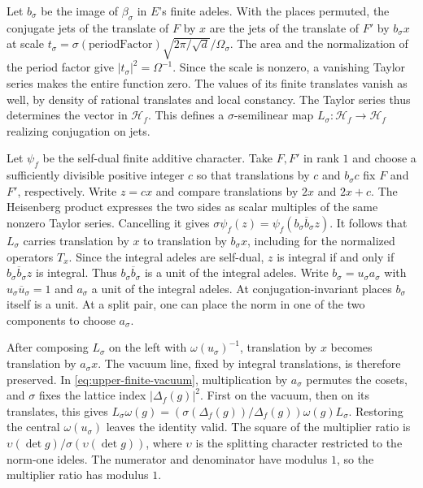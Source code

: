 Let \(b_\sigma\) be the image of \(\beta_\sigma\) in \(E\)'s finite
adeles. With the places permuted, the conjugate jets of the translate
of \(F\) by \(x\) are the jets of the translate of \(F'\) by
\(b_\sigma x\) at scale
\(t_\sigma=\sigma(\mathrm{periodFactor})\sqrt{2\pi/\sqrt d}/\Omega_\sigma\).
The area and the normalization of the period factor give
\(|t_\sigma|^2=\Omega^{-1}\). Since the scale is nonzero, a vanishing
Taylor series makes the entire function zero. The values of its
finite translates vanish as well, by density of rational translates
and local constancy. The Taylor series thus determines the vector
in \(\mathscr H_f\). This defines a \(\sigma\)-semilinear map
\(L_\sigma:\mathscr H_f\to\mathscr H_f\) realizing conjugation on jets.

Let \(\psi_f\) be the self-dual finite additive character. Take \(F,F'\)
in rank \(1\) and choose a sufficiently divisible positive integer
\(c\) so that translations by \(c\) and \(b_\sigma c\) fix \(F\) and
\(F'\), respectively. Write \(z=cx\) and compare translations by \(2x\)
and \(2x+c\). The Heisenberg product expresses the two sides as scalar
multiples of the same nonzero Taylor series. Cancelling it gives
\(\sigma\psi_f(z)=\psi_f(b_\sigma\overline b_\sigma z)\).
It follows that \(L_\sigma\) carries translation by \(x\) to translation
by \(b_\sigma x\), including for the normalized operators \(T_x\).
Since the integral adeles are self-dual, \(z\) is integral if and only
if \(b_\sigma\overline b_\sigma z\) is integral.
Thus \(b_\sigma\overline b_\sigma\) is a unit of the integral adeles.
Write \(b_\sigma=u_\sigma a_\sigma\) with \(u_\sigma\overline u_\sigma=1\)
and \(a_\sigma\) a unit of the integral adeles. At conjugation-invariant
places \(b_\sigma\) itself is a unit. At a split pair, one can place
the norm in one of the two components to choose \(a_\sigma\).

After composing \(L_\sigma\) on the left with \(\omega(u_\sigma)^{-1}\),
translation by \(x\) becomes translation by \(a_\sigma x\).
The vacuum line, fixed by integral translations, is therefore preserved.
In \eqref{eq:upper-finite-vacuum}, multiplication by \(a_\sigma\)
permutes the cosets, and \(\sigma\) fixes the lattice index
\(|\Delta_f(g)|^2\). First on the vacuum, then on its translates, this
gives \(L_\sigma\omega(g)=(\sigma(\Delta_f(g))/\Delta_f(g))\omega(g)L_\sigma\).
Restoring the central \(\omega(u_\sigma)\) leaves the identity valid.
The square of the multiplier ratio is
\(\upsilon(\det g)/\sigma(\upsilon(\det g))\), where \(\upsilon\) is
the splitting character restricted to the norm-one ideles.
The numerator and denominator have modulus \(1\), so the multiplier
ratio has modulus \(1\).

